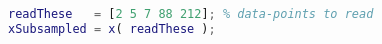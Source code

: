\begin{lstlisting}[language=matlab]
readThese   = [2 5 7 88 212]; % data-points to read
xSubsampled = x( readThese ); 

\end{lstlisting}